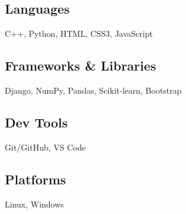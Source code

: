 \documentclass[12pt]{article}
\begin{document}
\subsection*{Languages}               \hspace*{4.4cm} C++, Python, HTML, CSS3, JavaScript \\
\subsection*{Frameworks \& Libraries} \hspace*{1cm} Django, NumPy, Pandas, Scikit-learn, Bootstrap \\
\subsection*{Dev Tools}               \hspace*{4.5cm} Git/GitHub, VS Code \\ 
\subsection*{Platforms}               \hspace*{4.59cm} Linux, Windows \\
\end{document}
